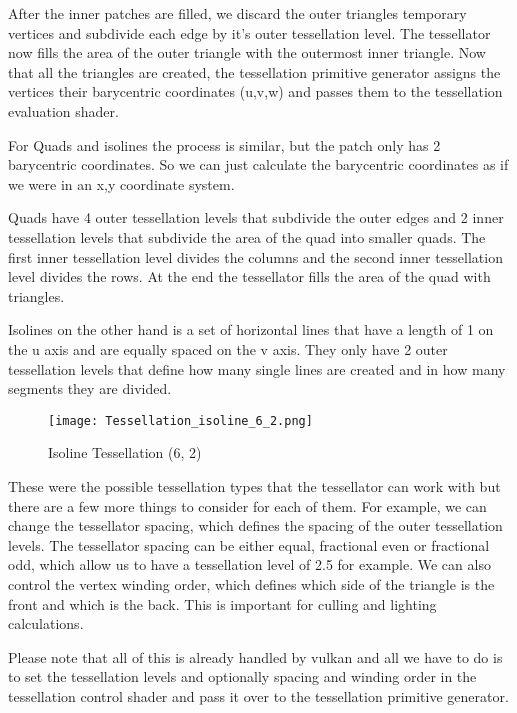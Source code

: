 \documentclass[12pt]{report} \usepackage{preamble}
\begin{document}
After the inner patches are filled, we discard the outer triangles temporary vertices and subdivide each edge by
it's outer tessellation level. The tessellator now fills the area of the outer triangle with the outermost inner triangle.
Now that all the triangles are created, the tessellation primitive generator assigns the vertices their barycentric coordinates (u,v,w)
and passes them to the tessellation evaluation shader. \cite{tessellation}

For Quads and isolines the process is similar, but the patch only has 2 barycentric coordinates. So we can just calculate the
barycentric coordinates as if we were in an x,y coordinate system. \cite{tessellation}

Quads have 4 outer tessellation levels that subdivide the outer edges and 2 inner tessellation levels that subdivide the area of the quad
into smaller quads. The first inner tessellation level divides the columns and the second inner tessellation level divides the rows.
At the end the tessellator fills the area of the quad with triangles. \cite{tessellation}

Isolines on the other hand is a set of horizontal lines that have a length of 1 on the u axis and are equally spaced on the v axis.
They only have 2 outer tessellation levels that define how many single lines are created and in how many segments they are divided.

\begin{figure}[hbtp]
	\centering \texttt{[image: Tessellation\_isoline\_6\_2.png]}
	\caption{Isoline Tessellation (6, 2)}
	\cite{fig:isoline}
\end{figure} \FloatBarrier

These were the possible tessellation types that the tessellator can work with but there are a few more things to consider for each of them.
For example, we can change the tessellator spacing, which defines the spacing of the outer tessellation levels. The tessellator spacing
can be either equal, fractional even or fractional odd, which allow us to have a tessellation level of 2.5 for example. \cite{tessellation}
We can also control the vertex winding order, which defines which side of the triangle is the front and which is the back. This is important
for culling and lighting calculations. \cite{tessellation}

Please note that all of this is already handled by vulkan and all we have to do is to set the tessellation levels and optionally spacing
and winding order in the tessellation control shader and pass it over to the tessellation primitive generator. \cite{tessellation}
\end{document}
